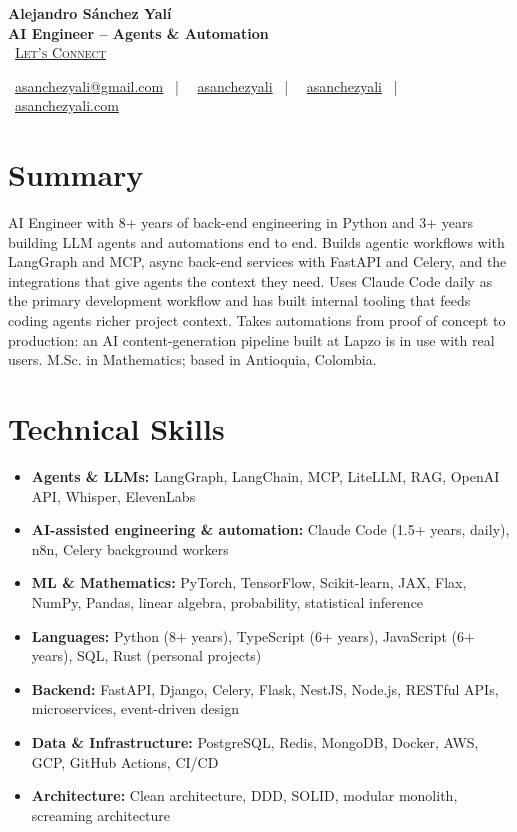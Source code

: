 \documentclass[letterpaper,10pt]{article}
\newcommand{\normalfaCalendar}{{\mdseries\faCalendar}}
\newcommand{\normalfaEnvelope}{{\mdseries\faEnvelope}}
\newcommand{\normalfaLinkedin}{{\mdseries\faLinkedin}}
\newcommand{\normalfaGithub}{{\mdseries\faGithub}}
\newcommand{\normalfaGlobe}{{\mdseries\faGlobe}}
\begin{document}
\begin{center}
\textbf{\LARGE Alejandro S\'anchez Yal\'i}\\[0.2em]
\textbf{\Large AI Engineer -- Agents \& Automation}\\[0.4em]
\small
\normalfaCalendar\ \href{https://cal.com/asanchezyali/full-time-opportunities}{\textsc{Let's Connect}}

\vspace{0.5em}
\normalfaEnvelope\ \href{mailto:asanchezyali@gmail.com}{asanchezyali@gmail.com}  ~|~
\normalfaLinkedin\ \href{https://www.linkedin.com/in/asanchezyali}{asanchezyali} ~|~
\normalfaGithub\ \href{https://github.com/asanchezyali}{asanchezyali}  ~|~
\normalfaGlobe\ \href{https://asanchezyali.com}{asanchezyali.com}
\end{center}


\section{Summary}
AI Engineer with 8+ years of back-end engineering in Python and 3+ years building LLM agents and automations end to end. Builds agentic workflows with LangGraph and MCP, async back-end services with FastAPI and Celery, and the integrations that give agents the context they need. Uses Claude Code daily as the primary development workflow and has built internal tooling that feeds coding agents richer project context. Takes automations from proof of concept to production: an AI content-generation pipeline built at Lapzo is in use with real users. M.Sc. in Mathematics; based in Antioquia, Colombia.

\section{Technical Skills}
\begin{itemize}[leftmargin=*, itemsep=0pt]
  \item \textbf{Agents \& LLMs:} LangGraph, LangChain, MCP, LiteLLM, RAG, OpenAI API, Whisper, ElevenLabs
  \item \textbf{AI-assisted engineering \& automation:} Claude Code (1.5+ years, daily), n8n, Celery background workers
  \item \textbf{ML \& Mathematics:} PyTorch, TensorFlow, Scikit-learn, JAX, Flax, NumPy, Pandas, linear algebra, probability, statistical inference
  \item \textbf{Languages:} Python (8+ years), TypeScript (6+ years), JavaScript (6+ years), SQL, Rust (personal projects)
  \item \textbf{Backend:} FastAPI, Django, Celery, Flask, NestJS, Node.js, RESTful APIs, microservices, event-driven design
  \item \textbf{Data \& Infrastructure:} PostgreSQL, Redis, MongoDB, Docker, AWS, GCP, GitHub Actions, CI/CD
  \item \textbf{Architecture:} Clean architecture, DDD, SOLID, modular monolith, screaming architecture
\end{itemize}
\end{document}
